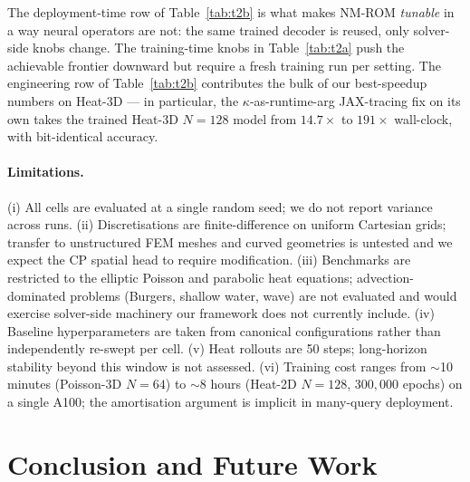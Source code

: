 \documentclass{article}
\begin{document}
  The deployment-time row of Table~\ref{tab:t2b} is what makes NM-ROM                                      
  \emph{tunable} in a way neural operators are not: the same trained                                       
  decoder is reused, only solver-side knobs change. The training-time                                      
  knobs in Table~\ref{tab:t2a} push the achievable frontier downward                                       
  but require a fresh training run per setting. The engineering row of                                     
  Table~\ref{tab:t2b} contributes the bulk of our best-speedup numbers                                     
  on Heat-3D --- in particular, the $\kappa$-as-runtime-arg JAX-tracing                                    
  fix on its own takes the trained Heat-3D $N=128$ model from $14.7\times$                                 
  to $191\times$ wall-clock, with bit-identical accuracy.                                                  
                                                                                                           
\FloatBarrier
\paragraph{Limitations.}
\label{sec:limitations}
(i) All cells are evaluated at a single random seed; we do not
report variance across runs. (ii) Discretisations are
finite-difference on uniform Cartesian grids; transfer to unstructured
FEM meshes and curved geometries is untested and we expect the CP
spatial head to require modification. (iii) Benchmarks are restricted
to the elliptic Poisson and parabolic heat equations; advection-dominated
problems (Burgers, shallow water, wave) are not evaluated and would
exercise solver-side machinery our framework does not currently
include. (iv) Baseline hyperparameters are taken from canonical
configurations rather than independently re-swept per cell.
(v) Heat rollouts are 50 steps; long-horizon stability beyond this
window is not assessed. (vi) Training cost ranges from $\sim$10
minutes (Poisson-3D $N{=}64$) to $\sim$8 hours (Heat-2D $N{=}128$,
$300{,}000$ epochs) on a single A100; the amortisation argument is
implicit in many-query deployment.

\section{Conclusion and Future Work}
\label{sec:conclusion}
\end{document}
